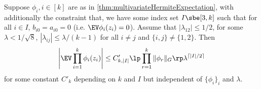 \documentclass[main.tex]{subfiles}
\begin{document}
\begin{lemma}\label{lemma:largeRhoMomentBound}
Suppose $\phi_i, i\in[k]$ are as in \cref{thm:multivariateHermiteExpectation}, with additionally  the constraint that, we have some index set $I \sbe [3, k]$ such that for all $i \in I$, $b_{i0} = a_{i0} = 0$ (i.e. $\EV \phi_i(z_i) = 0$).
Assume that $|\lambda_{12}| \le 1/2$, for some $\lambda < 1/\sqrt 8 $, $|\lambda_{ij}| \le \lambda/(k-1)$ for all $i \ne j$ and $\{i,j\} \ne \{1, 2\}$.
Then
\begin{align*}
    \left|\EV \prod_{i=1}^k \phi_i(z_i)\right| \le
    C'_{k, |I|} \lp \prod_{r=1}^k \|\phi_r\|_G\rp 
        \lambda^{\lceil |I|/2\rceil}
\end{align*}
for some constant $C'_k$ depending on $k$ and $I$ but independent of $\{\phi_i\}_i$ and $\lambda$.
\end{lemma}
\end{document}
